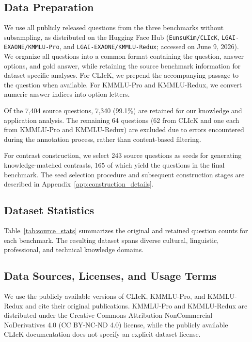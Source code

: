 \subsection{Data Preparation}

We use all publicly released questions from the three benchmarks without subsampling, as distributed on the Hugging Face Hub (\texttt{EunsuKim/CLIcK}, \texttt{LGAI-EXAONE/KMMLU-Pro}, and \texttt{LGAI-EXAONE/KMMLU-Redux}; accessed on June 9, 2026).
We organize all questions into a common format containing the question, answer options, and gold answer, while retaining the source benchmark information for dataset-specific analyses.
For CLIcK, we prepend the accompanying passage to the question when available.
For KMMLU-Pro and KMMLU-Redux, we convert numeric answer indices into option letters.

Of the 7,404 source questions, 7,340 (99.1\%) are retained for our knowledge and application analysis.
The remaining 64 questions (62 from CLIcK and one each from KMMLU-Pro and KMMLU-Redux) are excluded due to errors encountered during the annotation process, rather than content-based filtering.

For contrast construction, we select 243 source questions as seeds for generating knowledge-matched contrasts, 165 of which yield the questions in the final benchmark.
The seed selection procedure and subsequent construction stages are described in Appendix~\ref{app:construction_details}.

\subsection{Dataset Statistics}

Table~\ref{tab:source_stats} summarizes the original and retained question counts for each benchmark.
The resulting dataset spans diverse cultural, linguistic, professional, and technical knowledge domains.

\subsection{Data Sources, Licenses, and Usage Terms}
We use the publicly available versions of CLIcK, KMMLU-Pro, and KMMLU-Redux and cite their original publications.
KMMLU-Pro and KMMLU-Redux are distributed under the Creative Commons Attribution-NonCommercial-NoDerivatives 4.0 (CC BY-NC-ND 4.0) license, while the publicly available CLIcK documentation does not specify an explicit dataset license.


